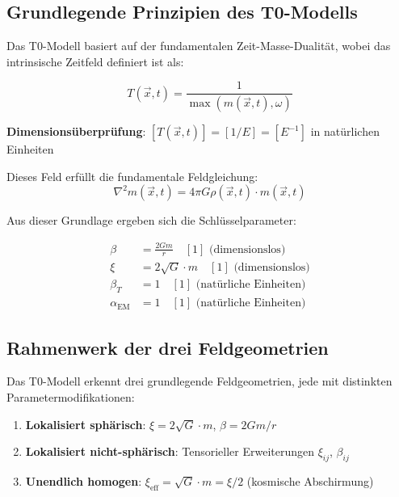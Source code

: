 \documentclass[12pt,a4paper]{article}
\newcommand{\Tfieldt}{T(\vec{x},t)}
\begin{document}
	\subsection{Grundlegende Prinzipien des T0-Modells}
	\label{subsec:t0_prinzipien}
	
	Das T0-Modell basiert auf der fundamentalen Zeit-Masse-Dualität, wobei das intrinsische Zeitfeld definiert ist als:
	
	\begin{equation}
		\Tfieldt = \frac{1}{\max(m(\vec{x},t), \omega)}
		\label{eq:zeitfeld_fundamental}
	\end{equation}
	
	\textbf{Dimensionsüberprüfung}: $[\Tfieldt] = [1/E] = [E^{-1}]$ in natürlichen Einheiten \checkmark
	
	Dieses Feld erfüllt die fundamentale Feldgleichung:
	\begin{equation}
		\nabla^2 m(\vec{x},t) = 4\pi G \rho(\vec{x},t) \cdot m(\vec{x},t)
		\label{eq:t0_feldgleichung}
	\end{equation}
	
	Aus dieser Grundlage ergeben sich die Schlüsselparameter:
	
	\begin{tcolorbox}[colback=blue!5!white,colframe=blue!75!black,title=T0-Modell-Parameter in natürlichen Einheiten]
		\begin{align}
			\beta &= \frac{2Gm}{r} \quad [1] \text{ (dimensionslos)} \\
			\xi &= 2\sqrt{G} \cdot m \quad [1] \text{ (dimensionslos)} \\
			\beta_T &= 1 \quad [1] \text{ (natürliche Einheiten)} \\
			\alpha_{\text{EM}} &= 1 \quad [1] \text{ (natürliche Einheiten)}
		\end{align}
	\end{tcolorbox}
	
	\subsection{Rahmenwerk der drei Feldgeometrien}
	\label{subsec:drei_geometrien}
	
	Das T0-Modell erkennt drei grundlegende Feldgeometrien, jede mit distinkten Parametermodifikationen:
	
	\begin{enumerate}
		\item \textbf{Lokalisiert sphärisch}: $\xi = 2\sqrt{G} \cdot m$, $\beta = 2Gm/r$
		\item \textbf{Lokalisiert nicht-sphärisch}: Tensorieller Erweiterungen $\xi_{ij}$, $\beta_{ij}$
		\item \textbf{Unendlich homogen}: $\xi_{\text{eff}} = \sqrt{G} \cdot m = \xi/2$ (kosmische Abschirmung)
	\end{enumerate}
	
\end{document}
